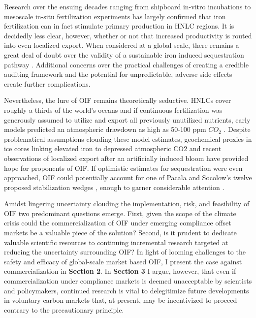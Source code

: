 Research over the ensuing decades ranging from shipboard in-vitro incubations \parencite{Martincaseiron1991} to mesoscale in-situ fertilization experiments \parencite{YoonOceanIronFertilization2016} has largely confirmed that iron fertilization can in fact stimulate primary production in HNLC regions. It is decidedly less clear, however, whether or not that increased productivity is routed into even localized export\parencite{BoydMesoscaleIronEnrichment2007}. When considered at a global scale, there remains a great deal of doubt over the validity of a sustainable iron induced sequestration pathway \parencite{WincklerOceandynamicsnot2016}. Additional concerns over the practical challenges of creating a credible auditing framework and the potential for unpredictable, adverse side effects create further complications.

Nevertheless, the lure of OIF remains theoretically seductive. HNLCs cover roughly a thirds of the world’s oceans \parencite{BoydMesoscaleIronEnrichment2007} and if continuous fertilization was generously assumed to utilize and export all previously unutilized nutrients, early models predicted an atmospheric drawdown as high as 50-100 ppm $CO_2$ \parencite{AumontGlobalizingresultsocean2006}. Despite problematical assumptions clouding these model estimates, geochemical proxies in ice cores \parencite{WincklerCovariantGlacialInterglacialDust2008} linking elevated iron to depressed atmospheric CO2 and recent observations of localized export after an artificially induced bloom \parencite{SmetacekDeepcarbonexport2012} have provided hope for proponents of OIF. If optimistic estimates for sequestration were even approached, OIF could potentially account for one of Pacala and Socolow’s twelve proposed stabilization wedges \parencite{PacalaStabilizationWedgesSolving2004}, enough to garner considerable attention \parencite{BuesselerExploringOceanIron2008}.

Amidst lingering uncertainty clouding the implementation, risk, and feasibility of OIF two predominant questions emerge. First, given the scope of the climate crisis could the commercialization of OIF under emerging compliance offset markets be a valuable piece of the solution? Second, is it prudent to dedicate valuable scientific resources to continuing incremental research targeted at reducing the uncertainty surrounding OIF? In light of looming challenges to the safety and efficacy of global-scale market based OIF, I present the case against commercialization in \textbf{Section 2}. In \textbf{Section 3} I argue, however, that even if commercialization under compliance markets is deemed unacceptable by scientists and policymakers, continued research is vital to delegitimize future developments in voluntary carbon markets that, at present, may be incentivized to proceed contrary to the precautionary principle.

